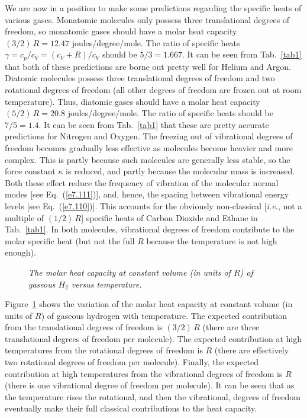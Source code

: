 We are now in a position to make some predictions regarding the specific heats
of various gases. Monatomic molecules only possess three translational degrees
of freedom, so monatomic gases should have a molar heat capacity $(3/2)\,R
= 12.47$ joules/degree/mole. The ratio of specific heats $\gamma = c_p / c_V
= (c_V + R)/ c_V$ should be $5/3 = 1.667$. It can be seen from Tab.~\ref{tab1} that both of
these predictions are borne out pretty well for Helium and Argon. 
Diatomic molecules possess three translational degrees of freedom and
two rotational degrees of freedom (all other degrees of freedom are frozen out
at room temperature). Thus, diatomic gases should have a molar heat capacity
$(5/2)\,R= 20.8$ joules/degree/mole. The ratio of specific heats should be
$7/5 = 1.4$. It can be seen from Tab.~\ref{tab1} that these are pretty accurate
predictions for Nitrogen and Oxygen. The freezing out of vibrational 
degrees of freedom becomes gradually less effective as molecules become heavier
and more complex. This is partly because such molecules are generally less 
stable, so the force constant $\kappa$ is reduced, and partly
because the molecular mass
is increased. Both these effect reduce the frequency of vibration of the 
molecular normal
modes [see Eq.~(\ref{e7.111})], and, hence, the spacing between vibrational energy levels
[see Eq.~(\ref{e7.110})]. This accounts for the obviously non-classical [{\em i.e.}, not
a multiple of $(1/2)\,R$] specific heats of Carbon Dioxide and Ethane in 
Tab.~\ref{tab1}.
In both molecules, vibrational degrees of freedom contribute to the molar specific
heat (but not the full $R$ because the temperature is not high enough).

\begin{figure}[ht]
\epsfysize=3in
\centerline{}
\caption{\em The molar heat capacity at constant volume
 (in units of $R$) of gaseous
$H_2$ versus temperature.}\label{fh2}
\end{figure}

Figure~\ref{fh2} shows the variation of the molar heat capacity at constant volume
 (in units of $R$) of gaseous hydrogen with temperature. The expected contribution
from the translational degrees of freedom is $(3/2)\,R$ (there are
three translational degrees of freedom per molecule). The 
expected contribution at
high temperatures from the rotational degrees of freedom is $R$
(there are effectively
two rotational degrees of freedom per molecule). Finally, the expected contribution at high temperatures from the vibrational degrees of freedom is $R$ (there
is one vibrational degree of freedom per molecule). It can be seen that
as the temperature rises the rotational, and then the vibrational, degrees
of freedom eventually make their full classical contributions to the heat
capacity.

